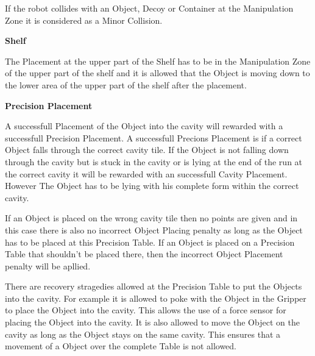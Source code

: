 If the robot collides with an Object, Decoy or Container at the Manipulation Zone it is considered as a Minor Collision.

\textbf{Shelf}

The Placement at the upper part of the Shelf has to be in the Manipulation Zone of the upper part of the shelf and it is allowed that the Object is moving down to the lower area of the upper part of the shelf after the placement. 


\textbf{Precision Placement}

A successfull Placement of the Object into the cavity will rewarded with a successfull Precision Placement. A successfull Precions Placement is if a  correct Object falls through the correct cavity tile. If the Object is not falling down through the cavity but is stuck in the cavity or is lying at the end of the run at the correct cavity it will be rewarded with an successfull Cavity Placement. However The Object has to be lying with his complete form within the correct cavity.

If an Object is placed on the wrong cavity tile then no points are given and in this case there is also no incorrect Object Placing penalty as long as the Object has to be placed at this Precision Table. If an Object is placed on a Precision Table that shouldn't be placed there, then the incorrect Object Placement penalty will be apllied. 

There are recovery stragedies allowed at the Precision Table to put the Objects into the cavity.
For example it is allowed to poke with the Object in the Gripper to place the Object into the cavity. This  allows the use of a force sensor for placing the Object into the cavity.
It is also allowed to move the Object on the cavity as long as the Object stays on the same cavity. This ensures that a movement of a Object over the complete Table is not allowed.

 


\newpage
%









%

%






